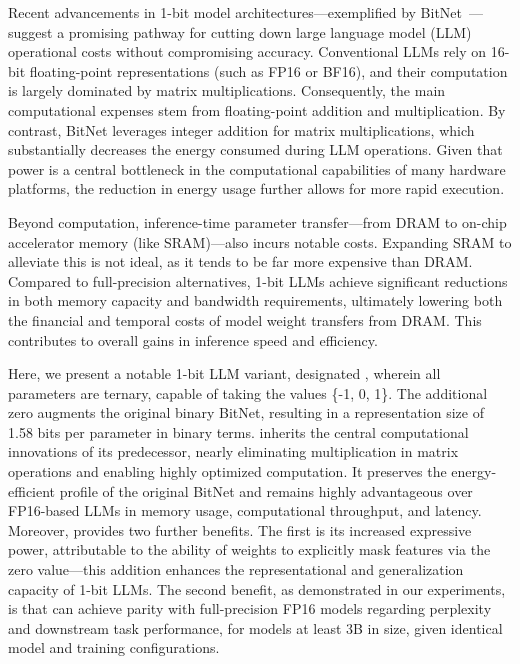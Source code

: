 Recent advancements in 1-bit model architectures—exemplified by BitNet~\cite{bitnet}—suggest a promising pathway for cutting down large language model (LLM) operational costs without compromising accuracy. Conventional LLMs rely on 16-bit floating-point representations (such as FP16 or BF16), and their computation is largely dominated by matrix multiplications. Consequently, the main computational expenses stem from floating-point addition and multiplication. By contrast, BitNet leverages integer addition for matrix multiplications, which substantially decreases the energy consumed during LLM operations. Given that power is a central bottleneck in the computational capabilities of many hardware platforms, the reduction in energy usage further allows for more rapid execution.

Beyond computation, inference-time parameter transfer—from DRAM to on-chip accelerator memory (like SRAM)—also incurs notable costs. Expanding SRAM to alleviate this is not ideal, as it tends to be far more expensive than DRAM. Compared to full-precision alternatives, 1-bit LLMs achieve significant reductions in both memory capacity and bandwidth requirements, ultimately lowering both the financial and temporal costs of model weight transfers from DRAM. This contributes to overall gains in inference speed and efficiency.

Here, we present a notable 1-bit LLM variant, designated \textbf{}, wherein all parameters are ternary, capable of taking the values \{-1, 0, 1\}. The additional zero augments the original binary BitNet, resulting in a representation size of 1.58 bits per parameter in binary terms.  inherits the central computational innovations of its predecessor, nearly eliminating multiplication in matrix operations and enabling highly optimized computation. It preserves the energy-efficient profile of the original BitNet and remains highly advantageous over FP16-based LLMs in memory usage, computational throughput, and latency. Moreover,  provides two further benefits. The first is its increased expressive power, attributable to the ability of weights to explicitly mask features via the zero value—this addition enhances the representational and generalization capacity of 1-bit LLMs. The second benefit, as demonstrated in our experiments, is that  can achieve parity with full-precision FP16 models regarding perplexity and downstream task performance, for models at least 3B in size, given identical model and training configurations.

